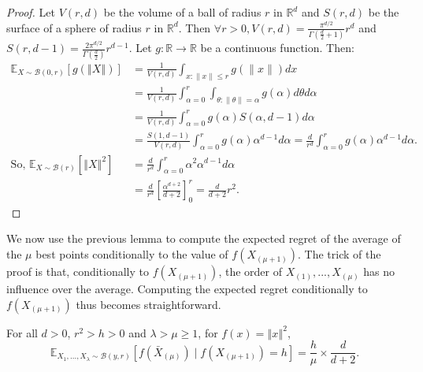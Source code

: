 \begin{proof}
Let $V(r,d)$ be the volume of a ball of radius $r$ in $\mathbb{R}^d$ and $S(r,d)$
be the surface of a sphere of radius $r$ in $\mathbb{R}^d$. Then
 $\forall r>0, V(r,d)=\frac{\pi^{d/2}}{\Gamma\left(\frac{d}{2}+1\right)}r^{d}$ and
 $S(r,d-1)=\frac{2\pi^{d/2}}{\Gamma\left(\frac{d}{2}\right)}r^{d-1}.$
Let $g:\mathbb{R}\rightarrow\mathbb{R}$ be a continuous function. Then:
\begin{align*}
\mathbb{E}_{X\sim\mathcal{B}(0,r)}\left[g\left(\left\Vert X\right\Vert \right)\right] & =
\frac{1}{V(r,d)}\int_{x:\lVert x\rVert \leq r} g(\lVert x\rVert )dx\\
&=\frac{1}{V(r,d)}\int_{\alpha=0}^{r}\int_{\theta:\lVert \theta\rVert  = \alpha} g(\alpha)d\theta d\alpha\\
&=\frac{1}{V(r,d)}\int_{\alpha=0}^{r} g(\alpha)S(\alpha,d-1) d\alpha\\
&=\frac{S(1,d-1)}{V(r,d)}\int_{\alpha=0}^{r} g(\alpha)\alpha^{d-1}d\alpha=\frac{d}{r^d}\int_{\alpha=0}^{r} g(\alpha)\alpha^{d-1}d\alpha.\\
\mbox{So,~}\mathbb{E}_{X\sim\mathcal{B}(r)}\left[\left\Vert X\right\Vert ^{2}\right] & = \frac{d}{r^d}\int_{\alpha=0}^{r} \alpha^2\alpha^{d-1}d\alpha\\
&=\frac{d}{r^d}\left[\frac{\alpha^{d+2}}{d+2}\right]^r_0=\frac{d}{d+2}r^2.
\end{align*}
\end{proof}
We now use the previous lemma to compute the expected regret\cite{bubeck2009pure} of the average of the $\mu$ best points conditionally to the value of $f(X_{(\mu+1)})$. The trick of the proof is that, conditionally to  $f(X_{(\mu+1)})$, the order of $X_{(1)},...,X_{(\mu)}$ has no influence over the average. Computing the expected regret conditionally to $f(X_{(\mu+1)})$ thus becomes straightforward.
\begin{lemma}\label{lm3}
\label{lem:expectation_k_avg}For all $d>0$, $r^2>h>0$ and $\lambda>\mu\geq 1$, for $f(x)=\left\Vert x\right\Vert ^{2}$, %
\[
\mathbb{E}_{X_1,...,X_\lambda\sim \mathcal{B}(y,r)}\left[f\left(\bar{X}_{(\mu)}\right)\mid f(X_{(\mu+1)})=h\right]=\frac{h}{\mu}\times\frac{d}{d+2}.
\]
\end{lemma}
